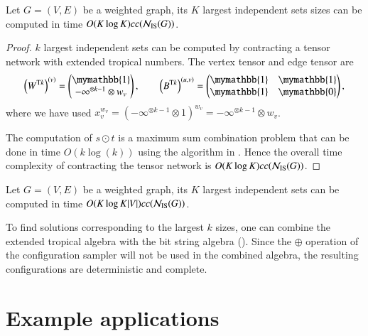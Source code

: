 \documentclass[review, onefignum, onetabnum]{siamart190516}
\begin{document}
\begin{theorem}
    Let $G = (V, E)$ be a weighted graph, its $K$ largest independent sets sizes can be computed in time $O(K\log K)cc({\mathcal{N}_{\rm IS}(G)})$.
\end{theorem}
\begin{proof}
$k$ largest independent sets can be computed by contracting a tensor network with extended tropical numbers. The vertex tensor and edge tensor are
\begin{equation}
    \left(W^{{\rm T}k}\right)^{(v)} = \left(\begin{matrix}
        \mymathbb{1} \\
        -\infty^{\otimes k-1} \otimes w_v
    \end{matrix}\right),   
    \qquad
        \left(B^{{\rm T}k}\right)^{(u, v)} = \left(\begin{matrix}
        \mymathbb{1}  & \mymathbb{1} \\
        \mymathbb{1} & \mymathbb{0}
    \end{matrix}\right),
\end{equation}
where we have used $x_v^{w_v} = (-\infty^{\otimes k-1} \otimes 1)^{w_v} = -\infty^{\otimes k-1} \otimes w_v$.

The computation of $s \odot t$ is a maximum sum combination problem that can be done in time $O(k\log(k))$ using the algorithm in . Hence the overall time complexity of contracting the tensor network is $O(K\log K)cc({\mathcal{N}_{\rm IS}(G)})$.
\end{proof}

\begin{corollary}
    Let $G = (V, E)$ be a weighted graph, its $K$ largest independent sets can be computed in time $O(K\log K|V|)cc({\mathcal{N}_{\rm IS}(G)})$.
\end{corollary}
To find solutions corresponding to the largest $k$ sizes, one can combine the extended tropical algebra with the bit string algebra ().
Since the $\oplus$ operation of the configuration sampler will not be used in the combined algebra, the resulting configurations are deterministic and complete.

\section{Example applications} \label{sec:examples}
\end{document}
